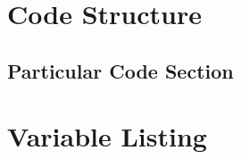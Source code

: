 \section{Code Structure}

\subsection{Particular Code Section}
\begin{comment}
\begin{figure}[H]
    \pythonfile[firstline=5,lastline=10]{./tex/function_programs/print_function.py}
    \caption{The print() function} \label{fig:print_function}
\end{figure}
\end{comment}

\section{Variable Listing}

